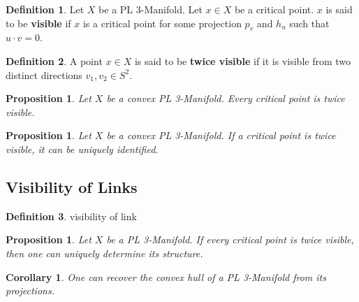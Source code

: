 \documentclass[12pt]{article}
\theoremstyle{theorem}
\newtheorem{corollary}[theorem]{Corollary}
\newtheorem{proposition}[theorem]{Proposition}
\theoremstyle{definition}
\newtheorem{definition}{Definition} [section]
\theoremstyle{remark}
\theoremstyle{gremark}
\theoremstyle{discussion}
\theoremstyle{notation}
\begin{document}
	\begin{definition}
		Let $X$ be a PL 3-Manifold. Let $x\in X$ be a critical point. $x$ is said to be \textbf{visible} if $x$ is a critical point for some projection $p_v$ and $h_u$ such that $u\cdot v=0$.
	\end{definition}

	\begin{definition}
		A point $x\in X$ is said to be \textbf{twice visible} if it is visible from two distinct directions $v_1,v_2\in S^2$.
	\end{definition}
	
	\begin{proposition}
		Let $X$ be a convex PL 3-Manifold. Every critical point is twice visible.
	\end{proposition}

	\begin{proposition}
		Let $X$ be a convex PL 3-Manifold. If a critical point is twice visible, it can be uniquely identified.
	\end{proposition}

	\subsection*{Visibility of Links}

	\begin{definition}
		visibility of link
	\end{definition}

	\begin{proposition}
		Let $X$ be a PL 3-Manifold. If every critical point is twice visible, then one can uniquely determine its structure.
	\end{proposition}

	\begin{corollary}
		One can recover the convex hull of a PL 3-Manifold from its projections.
	\end{corollary}

	
	
	
	
	
	
	
	
\end{document}
